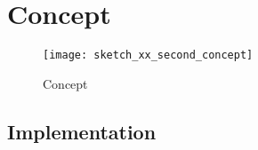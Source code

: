 \section{Concept}



\begin{figure}[h]
\centering

\texttt{[image: sketch\_xx\_second\_concept]}

\caption{Concept}
\end{figure}

\subsection{Implementation}

